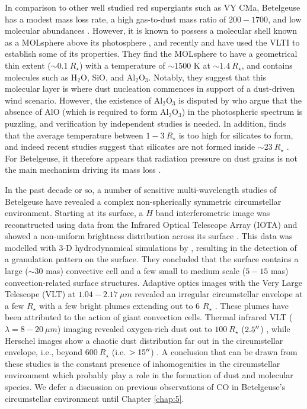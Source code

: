 In comparison to other well studied red supergiants such as VY CMa, Betelgeuse has a modest mass loss rate, a high gas-to-dust mass ratio of $200-1700$, and low molecular abundances \citep{harper_2001}. However, it is known to possess a molecular shell known as a MOLsphere above its photosphere \citep{tsuji_2000}, and recently \cite{verhoelst_2006} and \cite{perrin_2007} have used the VLTI to establish some of its properties. They find the MOLsphere to have a geometrical thin extent ($\sim 0.1 \ R_{\star}$) with a temperature of $\sim 1500$ K at $\sim 1.4 \ R_{\star}$, and contains molecules such as H$_{2}$O, SiO, and Al$_{2}$O$_{3}$. Notably, they suggest that this molecular layer is where dust nucleation commences in support of a dust-driven wind scenario. However, the existence of Al$_{2}$O$_{3}$ is disputed by \cite{kaminski_2013} who argue that the absence of AlO (which is required to form Al$_{2}$O$_{3}$) in the photospheric spectrum is puzzling, and verification by independent studies is needed. In addition, \cite{woitke_2006} finds that the average temperature between $1-3 \ R_{\star}$ is too high for silicates to form, and indeed recent studies suggest that silicates are not formed inside $\sim 23 \ R_{\star}$ \citep{skinner_1997,tatebe_2007}. For Betelgeuse, it therefore appears that radiation pressure on dust grains is not the main mechanism driving its mass loss \citep{harper_2010}.

In the past decade or so, a number of sensitive multi-wavelength studies of Betelgeuse have revealed a complex non-spherically symmetric circumstellar environment. Starting at its surface, a $H$ band interferometric image was reconstructed using data from the Infrared Optical Telescope Array (IOTA) and showed a non-uniform brightness distribution across its surface \citep{haubois_2009}. This data was modelled with 3-D hydrodynamical simulations by \cite{chiavassa_2010}, resulting in the detection of a granulation pattern on the surface. They concluded that  the surface contains a large ($\sim 30$ mas) convective cell and a few small to medium scale ($5-15$ mas) convection-related surface structures. Adaptive optics images with the Very Large Telescope (VLT) at $1.04 -2.17 \ \mu m$ revealed an irregular circumstellar envelope at a few $R_{\star}$ with a few bright plumes extending out to 6 $R_{\star}$ \citep{kervella_2009}. These plumes have been attributed to the action of giant convection cells. Thermal infrared VLT ($\lambda=8-20 \ \mu m$) imaging revealed oxygen-rich dust out to $100 \ R_{\star}$ ($2.5^{\prime\prime}$) \citep{kervella_2011}, while Herschel images show a chaotic dust distribution far out in the circumstellar envelope, i.e., beyond $600 \ R_{\star}$ (i.e. $> 15^{\prime\prime}$) \citep{decin_2012}. A conclusion that can be drawn from these studies is the constant presence of inhomogenities in the circumstellar environment which probably play a role in the formation of dust and molecular species. We defer a discussion on previous observations of CO in Betelgeuse's circumstellar environment until Chapter \ref{chap:5}.

